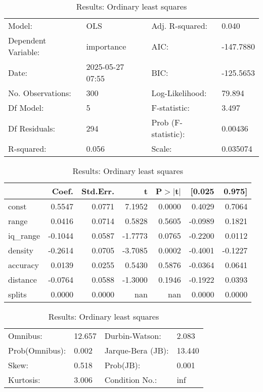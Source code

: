 \begin{table}
\caption{Results: Ordinary least squares}
\label{}
\begin{center}
\begin{tabular}{llll}
\hline
Model:              & OLS              & Adj. R-squared:     & 0.040      \\
Dependent Variable: & importance       & AIC:                & -147.7880  \\
Date:               & 2025-05-27 07:55 & BIC:                & -125.5653  \\
No. Observations:   & 300              & Log-Likelihood:     & 79.894     \\
Df Model:           & 5                & F-statistic:        & 3.497      \\
Df Residuals:       & 294              & Prob (F-statistic): & 0.00436    \\
R-squared:          & 0.056            & Scale:              & 0.035074   \\
\hline
\end{tabular}
\end{center}

\begin{center}
\begin{tabular}{lrrrrrr}
\hline
          &   Coef. & Std.Err. &       t & P$> |$t$|$ &  [0.025 &  0.975]  \\
\hline
const     &  0.5547 &   0.0771 &  7.1952 &      0.0000 &  0.4029 &  0.7064  \\
range     &  0.0416 &   0.0714 &  0.5828 &      0.5605 & -0.0989 &  0.1821  \\
iq\_range & -0.1044 &   0.0587 & -1.7773 &      0.0765 & -0.2200 &  0.0112  \\
density   & -0.2614 &   0.0705 & -3.7085 &      0.0002 & -0.4001 & -0.1227  \\
accuracy  &  0.0139 &   0.0255 &  0.5430 &      0.5876 & -0.0364 &  0.0641  \\
distance  & -0.0764 &   0.0588 & -1.3000 &      0.1946 & -0.1922 &  0.0393  \\
splits    &  0.0000 &   0.0000 &     nan &         nan &  0.0000 &  0.0000  \\
\hline
\end{tabular}
\end{center}

\begin{center}
\begin{tabular}{llll}
\hline
Omnibus:       & 12.657 & Durbin-Watson:    & 2.083   \\
Prob(Omnibus): & 0.002  & Jarque-Bera (JB): & 13.440  \\
Skew:          & 0.518  & Prob(JB):         & 0.001   \\
Kurtosis:      & 3.006  & Condition No.:    & inf     \\
\hline
\end{tabular}
\end{center}
\end{table}
